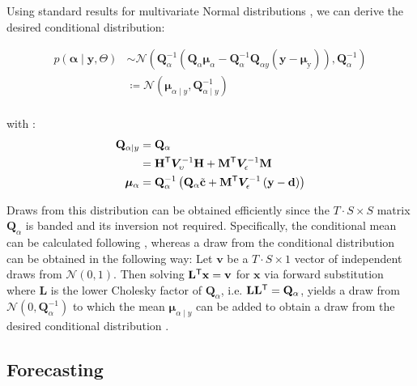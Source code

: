 \documentclass[notitlepage,a4paper,12pt]{article}
\newcommand{\transpose}[1]{{#1}^{\sf{T}}}
\begin{document}
Using standard results for multivariate Normal distributions \citep[e.g.][pp. 86-87]{bishop_prml_2006}, we can derive the desired conditional distribution:

\begin{align*}
    p
    \left(
        \boldsymbol{\alpha} \mid \mathbf{y}, \Theta
     \right) 
    &\sim
    \mathcal{N}
    \left(
    \mathbf{Q}^{-1}_{\alpha} \left( \mathbf{Q}_{\alpha}\boldsymbol{\mu}_{\alpha} - \mathbf{Q}^{-1}_{\alpha} \mathbf{Q}_{\alpha y} \left(\mathbf{y} - \boldsymbol{\mu}_{\text{y}}\right)\right), \mathbf{Q}_{\alpha}^{-1}
    \right) \\
    &\coloneqq \mathcal{N}
        \left(
            \boldsymbol{\mu}_{\alpha\mid y}, \mathbf{Q}_{\alpha\mid y}^{-1}
        \right) \\
\end{align*}

with \citep[see also][eqn. 6-8]{chanjeliazkov_2009}:
\begin{align*}
    \mathbf{Q}_{\alpha\mid y} &= \mathbf{Q}_{\alpha} \\
    &= 
    \transpose{\mathbf{H}} \bm{V}^{-1}_{\upsilon} \mathbf{H} + {\transpose{\mathbf{M}} \bm{V}^{-1}_{\epsilon}\mathbf{M}}\\
    \boldsymbol\mu_{\alpha} &= \mathbf{Q}_{\alpha}^{-1} \left(\mathbf{Q}_{\alpha} \tilde{\mathbf{c}}+ \transpose{\mathbf{M}} \bm{V}_{\epsilon}^{-1} \left(\mathbf{y} - \mathbf{d}\right) \right)
\end{align*}

Draws from this distribution can be obtained efficiently since the $T\cdot S \times S$ matrix $\mathbf{Q}_{\alpha}$ is banded and its inversion not required. Specifically, the conditional mean can be calculated following \citet[][Algorithm 2.1]{rueheld_2005}, whereas a draw from the conditional distribution can be obtained in the following way: Let $\mathbf{v}$ be a $T\cdot S \times 1$ vector of independent draws from $\mathcal{N}(0,1)$. Then solving $\transpose{\mathbf{L}}\mathbf{x} = \mathbf{v}$ for $\mathbf{x}$ via forward substitution where $\mathbf{L}$ is the lower Cholesky factor of $\mathbf{Q}_{\alpha}$, i.e. $\mathbf{L}\transpose{\mathbf{L}} = \mathbf{Q}_{\alpha}$, yields a draw from $\mathcal{N}(0, \mathbf{Q}^{-1}_{\alpha})$ to which the mean $\boldsymbol{\mu}_{\alpha\mid y}$ can be added to obtain a draw from the desired conditional distribution \citep[][Algorithm 2.4]{rueheld_2005}.

\subsection{Forecasting}
\end{document}

